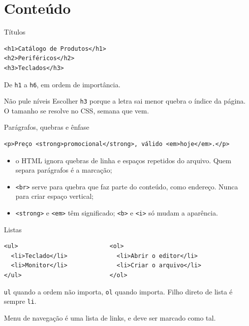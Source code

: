 \documentclass{beamer}
\begin{document}
\section{Conteúdo}

\begin{frame}[fragile]{Títulos}
  \begin{verbatim}
<h1>Catálogo de Produtos</h1>
<h2>Periféricos</h2>
<h3>Teclados</h3>
  \end{verbatim}

  \vspace{0.3cm}
  De \texttt{h1} a \texttt{h6}, em ordem de importância.

  \begin{alertblock}{Não pule níveis}
    Escolher \texttt{h3} porque a letra sai menor quebra o índice da página. O
    tamanho se resolve no CSS, semana que vem.
  \end{alertblock}
\end{frame}

\begin{frame}[fragile]{Parágrafos, quebras e ênfase}
  \begin{verbatim}
<p>Preço <strong>promocional</strong>, válido <em>hoje</em>.</p>
  \end{verbatim}

  \vspace{0.3cm}
  \begin{itemize}
    \item o HTML ignora quebras de linha e espaços repetidos do arquivo. Quem
          separa parágrafos é a marcação;
    \item \texttt{<br>} serve para quebra que faz parte do conteúdo, como
          endereço. Nunca para criar espaço vertical;
    \item \texttt{<strong>} e \texttt{<em>} têm significado; \texttt{<b>} e
          \texttt{<i>} só mudam a aparência.
  \end{itemize}
\end{frame}

\begin{frame}[fragile]{Listas}
  \begin{verbatim}
<ul>                          <ol>
  <li>Teclado</li>              <li>Abrir o editor</li>
  <li>Monitor</li>              <li>Criar o arquivo</li>
</ul>                         </ol>
  \end{verbatim}

  \vspace{0.3cm}
  \texttt{ul} quando a ordem não importa, \texttt{ol} quando importa. Filho
  direto de lista é sempre \texttt{li}.

  \vspace{0.3cm}
  Menu de navegação é uma lista de links, e deve ser marcado como tal.
\end{frame}
\end{document}
